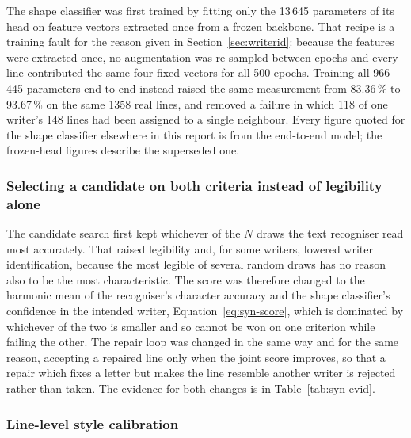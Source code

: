 The shape classifier was first trained by fitting only the 13\,645 parameters of its head on feature vectors extracted once from a frozen backbone. That recipe is a training fault for the reason given in Section~\ref{sec:writerid}: because the features were extracted once, no augmentation was re-sampled between epochs and every line contributed the same four fixed vectors for all 500 epochs. Training all 966\,445 parameters end to end instead raised the same measurement from 83.36\,\% to 93.67\,\% on the same 1358 real lines, and removed a failure in which 118 of one writer's 148 lines had been assigned to a single neighbour. Every figure quoted for the shape classifier elsewhere in this report is from the end-to-end model; the frozen-head figures describe the superseded one.

\subsubsection{Selecting a candidate on both criteria instead of legibility alone}
\label{sec:later-joint}

The candidate search first kept whichever of the $N$ draws the text recogniser read most accurately. That raised legibility and, for some writers, lowered writer identification, because the most legible of several random draws has no reason also to be the most characteristic. The score was therefore changed to the harmonic mean of the recogniser's character accuracy and the shape classifier's confidence in the intended writer, Equation~\ref{eq:syn-score}, which is dominated by whichever of the two is smaller and so cannot be won on one criterion while failing the other. The repair loop was changed in the same way and for the same reason, accepting a repaired line only when the joint score improves, so that a repair which fixes a letter but makes the line resemble another writer is rejected rather than taken. The evidence for both changes is in Table~\ref{tab:syn-evid}.

\subsubsection{Line-level style calibration}
\label{sec:later-cal}

